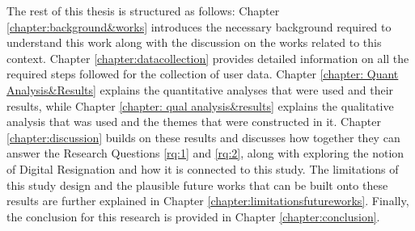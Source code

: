 The rest of this thesis is structured as follows: Chapter \ref{chapter:background&works} introduces the necessary background required to understand this work along with the discussion on the works related to this context. Chapter \ref{chapter:datacollection} provides detailed information on all the required steps followed for the collection of user data. Chapter \ref{chapter: Quant Analysis&Results} explains the quantitative analyses that were used and their results, while Chapter \ref{chapter: qual analysis&results} explains the qualitative analysis that was used and the themes that were constructed in it. Chapter \ref{chapter:discussion} builds on these results and discusses how together they can answer the Research Questions \ref{rq:1} and \ref{rq:2}, along with exploring the notion of Digital Resignation and how it is connected to this study. The limitations of this study design and the plausible future works that can be built onto these results are further explained in Chapter \ref{chapter:limitationsfutureworks}. Finally, the conclusion for this research is provided in Chapter \ref{chapter:conclusion}.